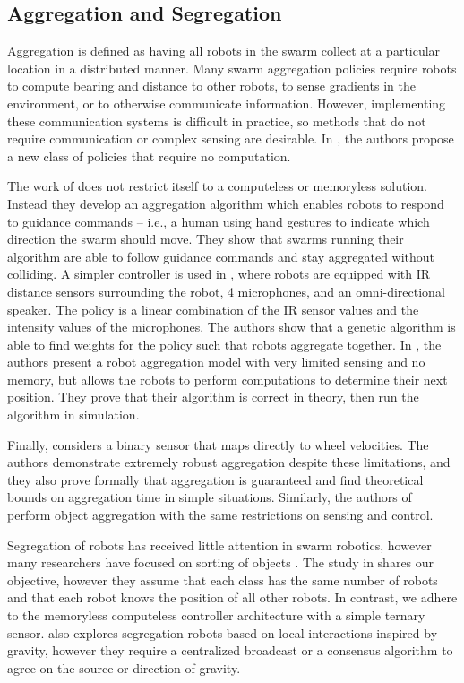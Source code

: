 \documentclass[conference]{IEEEtran}
\begin{document}
  \subsection{Aggregation and Segregation}
    Aggregation is defined as having all robots in the swarm collect at a particular location in a distributed manner. Many swarm aggregation policies require robots to compute bearing and distance to other robots, to sense gradients in the environment, or to otherwise communicate information. However, implementing these communication systems is difficult in practice, so methods that do not require communication or complex sensing are desirable. In \cite{gauci_self-organized_2014}, the authors propose a new class of policies that require no computation.

    The work of \cite{gasparri_swarm_2012} does not restrict itself to a computeless or memoryless solution. Instead they develop an aggregation algorithm which enables robots to respond to guidance commands -- i.e., a human using hand gestures to indicate which direction the swarm should move. They show that swarms running their algorithm are able to follow guidance commands and stay aggregated without colliding. A simpler controller is used in \cite{bahgeci_evolving_2005}, where robots are equipped with IR distance sensors surrounding the robot, 4 microphones, and an omni-directional speaker. The policy is a linear combination of the IR sensor values and the intensity values of the microphones. The authors show that a genetic algorithm is able to find weights for the policy such that robots aggregate together. In \cite{ando_distributed_1999}, the authors present a robot aggregation model with very limited sensing and no memory, but allows the robots to perform computations to determine their next position. They prove that their algorithm is correct in theory, then run the algorithm in simulation.

    Finally, \cite{gauci_self-organized_2014} considers a binary sensor that maps directly to wheel velocities. The authors demonstrate extremely robust aggregation despite these limitations, and they also prove formally that aggregation is guaranteed and find theoretical bounds on aggregation time in simple situations. Similarly, the authors of \cite{gauci_clustering_2014} perform object aggregation with the same restrictions on sensing and control.

    Segregation of robots has received little attention in swarm robotics, however many researchers have focused on sorting of objects \cite{vardy_accelerated_2012} \cite{holland_collective_1998} \cite{tao_wang_collective_2004} \cite{holland_stigmergy_1999}. The study in \cite{santos_segregation_2014} shares our objective, however they assume that each class has the same number of robots and that each robot knows the position of all other robots. In contrast, we adhere to the memoryless computeless controller architecture with a simple ternary sensor. \cite{gros_segregation_2009} also explores segregation robots based on local interactions inspired by gravity, however they require a centralized broadcast or a consensus algorithm to agree on the source or direction of gravity.
\end{document}
